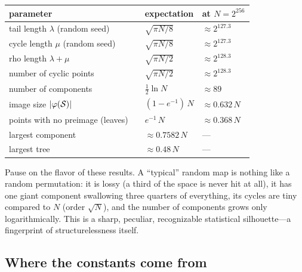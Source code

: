 \begin{center}
\begin{tabular}{@{}llll@{}}
  \toprule
  parameter && expectation & at $N = 2^{256}$ \\
  \midrule
  tail length $\lambda$ (random seed)   && $\sqrt{\pi N / 8}$        & $\approx 2^{127.3}$ \\
  cycle length $\mu$ (random seed)      && $\sqrt{\pi N / 8}$        & $\approx 2^{127.3}$ \\
  rho length $\lambda + \mu$            && $\sqrt{\pi N / 2}$        & $\approx 2^{128.3}$ \\
  number of cyclic points               && $\sqrt{\pi N / 2}$        & $\approx 2^{128.3}$ \\
  number of components                  && $\tfrac12 \ln N$          & $\approx 89$ \\
  image size $|\varphi(\mathcal{S})|$        && $(1 - e^{-1})\,N$         & $\approx 0.632\,N$ \\
  points with no preimage (leaves)      && $e^{-1}\, N$              & $\approx 0.368\,N$ \\
  largest component                     && $\approx 0.7582\,N$       & --- \\
  largest tree                          && $\approx 0.48\,N$         & --- \\
  \bottomrule
\end{tabular}
\end{center}

\noindent
Pause on the flavor of these results. A ``typical'' random map is nothing
like a random permutation: it is lossy (a third of the space is never hit
at all), it has one giant component swallowing three quarters of
everything, its cycles are tiny compared to $N$ (order $\sqrt{N}$), and
the number of components grows only logarithmically. This is a sharp,
peculiar, recognizable statistical silhouette---a fingerprint of
structurelessness itself.

\subsection{Where the constants come from}\label{sec:singularity}

